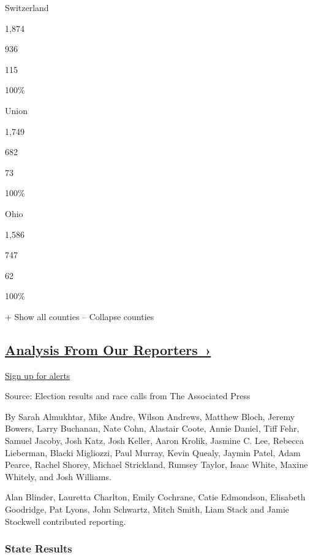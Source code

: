 Switzerland

1,874

936

115

100\%

Union

1,749

682

73

100\%

Ohio

1,586

747

62

100\%

+ Show all counties -- Collapse counties

\hypertarget{analysis-from-our-reporters-}{%
\subsection{\texorpdfstring{\href{https://www.nytimes.com/interactive/2018/11/06/us/elections/live-midterm-election-analysis-updates.html}{Analysis
From Our
Reporters~›}}{Analysis From Our Reporters~›}}\label{analysis-from-our-reporters-}}

\protect\hyperlink{}{Sign up for alerts}

Source: Election results and race calls from The Associated Press

By Sarah Almukhtar, Mike Andre, Wilson Andrews, Matthew Bloch, Jeremy
Bowers, Larry Buchanan, Nate Cohn, Alastair Coote, Annie Daniel, Tiff
Fehr, Samuel Jacoby, Josh Katz, Josh Keller, Aaron Krolik, Jasmine C.
Lee, Rebecca Lieberman, Blacki Migliozzi, Paul Murray, Kevin Quealy,
Jaymin Patel, Adam Pearce, Rachel Shorey, Michael Strickland, Rumsey
Taylor, Isaac White, Maxine Whitely, and Josh Williams.

Alan Blinder, Lauretta Charlton, Emily Cochrane, Catie Edmondson,
Elisabeth Goodridge, Pat Lyons, John Schwartz, Mitch Smith, Liam Stack
and Jamie Stockwell contributed reporting.

\hypertarget{state-results}{%
\subsubsection{State Results}\label{state-results}}

